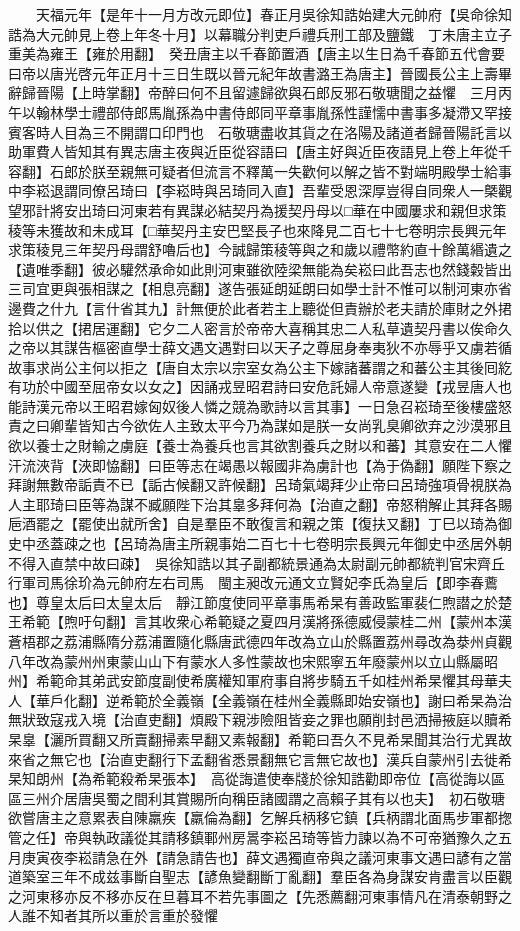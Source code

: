 　　天福元年【是年十一月方改元即位】春正月吳徐知誥始建大元帥府【吳命徐知誥為大元帥見上卷上年冬十月】以幕職分判吏戶禮兵刑工部及鹽鐵　丁未唐主立子重美為雍王【雍於用翻】　癸丑唐主以千春節置酒【唐主以生日為千春節五代會要曰帝以唐光啓元年正月十三日生既以晉元紀年故書潞王為唐主】晉國長公主上壽畢辭歸晉陽【上時掌翻】帝醉曰何不且留遽歸欲與石郎反邪石敬瑭聞之益懼　三月丙午以翰林學士禮部侍郎馬胤孫為中書侍郎同平章事胤孫性謹懦中書事多凝滯又罕接賓客時人目為三不開謂口印門也　石敬瑭盡收其貨之在洛陽及諸道者歸晉陽託言以助軍費人皆知其有異志唐主夜與近臣從容語曰【唐主好與近臣夜語見上卷上年從千容翻】石郎於朕至親無可疑者但流言不釋萬一失歡何以解之皆不對端明殿學士給事中李崧退謂同僚呂琦曰【李崧時與呂琦同入直】吾輩受恩深厚豈得自同衆人一槩觀望邪計將安出琦曰河東若有異謀必結契丹為援契丹母以□華在中國屢求和親但求策稜等未獲故和未成耳【□華契丹主安巴堅長子也來降見二百七十七卷明宗長興元年求策稜見三年契丹母謂舒嚕后也】今誠歸策稜等與之和歲以禮幣約直十餘萬緡遺之【遺唯季翻】彼必驩然承命如此則河東雖欲陸梁無能為矣崧曰此吾志也然錢糓皆出三司宜更與張相謀之【相息亮翻】遂告張延朗延朗曰如學士計不惟可以制河東亦省邊費之什九【言什省其九】計無便於此者若主上聽從但責辦於老夫請於庫財之外捃拾以供之【捃居運翻】它夕二人密言於帝帝大喜稱其忠二人私草遺契丹書以俟命久之帝以其謀告樞密直學士薛文遇文遇對曰以天子之尊屈身奉夷狄不亦辱乎又虜若循故事求尚公主何以拒之【唐自太宗以宗室女為公主下嫁諸蕃謂之和蕃公主其後囘紇有功於中國至屈帝女以女之】因誦戎昱昭君詩曰安危託婦人帝意遂變【戎昱唐人也能詩漢元帝以王昭君嫁匈奴後人憐之競為歌詩以言其事】一日急召崧琦至後樓盛怒責之曰卿輩皆知古今欲佐人主致太平今乃為謀如是朕一女尚乳臭卿欲弃之沙漠邪且欲以養士之財輸之虜庭【養士為養兵也言其欲割養兵之財以和蕃】其意安在二人懼汗流浹背【浹即恊翻】曰臣等志在竭愚以報國非為虜計也【為于偽翻】願陛下察之拜謝無數帝詬責不已【詬古候翻又許候翻】呂琦氣竭拜少止帝曰呂琦強項骨視朕為人主耶琦曰臣等為謀不臧願陛下治其辠多拜何為【治直之翻】帝怒稍解止其拜各賜巵酒罷之【罷使出就所舍】自是羣臣不敢復言和親之策【復扶又翻】丁巳以琦為御史中丞蓋疎之也【呂琦為唐主所親事始二百七十七卷明宗長興元年御史中丞居外朝不得入直禁中故曰疎】　吳徐知誥以其子副都統景通為太尉副元帥都統判官宋齊丘行軍司馬徐玠為元帥府左右司馬　閩主昶改元通文立賢妃李氏為皇后【即李春鷰也】尊皇太后曰太皇太后　靜江節度使同平章事馬希杲有善政監軍裴仁煦譛之於楚王希範【煦吁句翻】言其收衆心希範疑之夏四月漢將孫德威侵蒙桂二州【蒙州本漢蒼梧郡之荔浦縣隋分荔浦置隨化縣唐武德四年改為立山於縣置荔州尋改為㳟州貞觀八年改為蒙州州東蒙山山下有蒙水人多性蒙故也宋熙寧五年廢蒙州以立山縣屬昭州】希範命其弟武安節度副使希廣權知軍府事自將步騎五千如桂州希杲懼其母華夫人【華戶化翻】逆希範於全義嶺【全義嶺在桂州全義縣即始安嶺也】謝曰希杲為治無狀致寇戎入境【治直吏翻】煩殿下親涉險阻皆妾之罪也願削封邑洒掃掖庭以贖希杲辠【灑所買翻又所賣翻掃素早翻又素報翻】希範曰吾久不見希杲聞其治行尤異故來省之無它也【治直吏翻行下孟翻省悉景翻無它言無它故也】漢兵自蒙州引去徙希杲知朗州【為希範殺希杲張本】　高從誨遣使奉牋於徐知誥勸即帝位【高從誨以區區三州介居唐吳蜀之間利其賞賜所向稱臣諸國謂之高賴子其有以也夫】　初石敬瑭欲嘗唐主之意累表自陳羸疾【羸倫為翻】乞解兵柄移它鎮【兵柄謂北面馬步軍都揔管之任】帝與執政議從其請移鎮鄆州房暠李崧呂琦等皆力諫以為不可帝猶豫久之五月庚寅夜李崧請急在外【請急請告也】薛文遇獨直帝與之議河東事文遇曰諺有之當道築室三年不成兹事斷自聖志【諺魚變翻斷丁亂翻】羣臣各為身謀安肯盡言以臣觀之河東移亦反不移亦反在旦暮耳不若先事圖之【先悉薦翻河東事情凡在清泰朝野之人誰不知者其所以重於言重於發懼